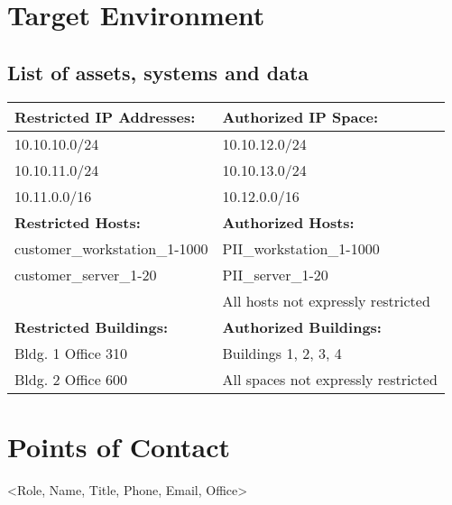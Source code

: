 \documentclass[12pt,letterpaper]{article}
\begin{document}
\newpage
\appendix
\section{Target Environment}
\subsection{List of assets, systems and data}
\begin{tabularx}{\textwidth}{|X|X|}
    \hline
    \textbf{Restricted IP Addresses:} & \textbf{Authorized IP Space:} \\
    \hline
    10.10.10.0/24 & 10.10.12.0/24 \\
    10.10.11.0/24 & 10.10.13.0/24 \\
    10.11.0.0/16 & 10.12.0.0/16 \\
    \hline
    \textbf{Restricted Hosts:} & \textbf{Authorized Hosts:} \\
    \hline
    customer\_workstation\_1-1000 & PII\_workstation\_1-1000 \\
    customer\_server\_1-20 & PII\_server\_1-20 \\
     & All hosts not expressly restricted \\
    \hline
    \textbf{Restricted Buildings:} & \textbf{Authorized Buildings:} \\
    \hline
    Bldg. 1 Office 310 & Buildings 1, 2, 3, 4 \\
    Bldg. 2 Office 600 & All spaces not expressly restricted \\
    \hline
\end{tabularx}

\section{Points of Contact}
<Role, Name, Title, Phone, Email, Office>
\end{document}
